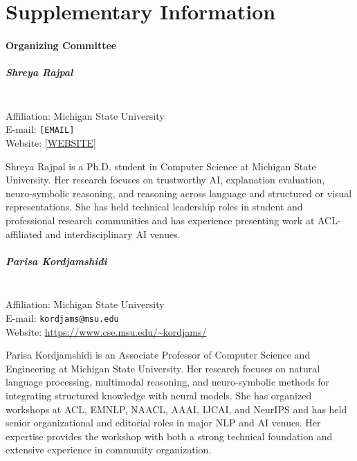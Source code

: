 \documentclass[11pt]{article}
\begin{document}
\newpage
\section*{Supplementary Information}

\paragraph{Organizing Committee}

\subparagraph{Shreya Rajpal}
\phantom{ }\\
\indent Affiliation: Michigan State University\\
\indent E-mail: \texttt{[EMAIL]}\\
\indent Website: \url{[WEBSITE]}

Shreya Rajpal is a Ph.D. student in Computer Science at Michigan State
University. Her research focuses on trustworthy AI, explanation
evaluation, neuro-symbolic reasoning, and reasoning across language and
structured or visual representations. 
She has held technical
leadership roles in student and professional research communities and
has experience presenting work at ACL-affiliated and interdisciplinary
AI venues.

\subparagraph{Parisa Kordjamshidi}
\phantom{ }\\
\indent Affiliation: Michigan State University\\
\indent E-mail: \texttt{kordjams@msu.edu}\\
\indent Website:
\url{https://www.cse.msu.edu/~kordjams/}

Parisa Kordjamshidi is an Associate Professor of Computer Science and
Engineering at Michigan State University. Her research focuses on
natural language processing, multimodal reasoning, and neuro-symbolic
methods for integrating structured knowledge with neural models. She
has organized workshops at ACL, EMNLP, NAACL, AAAI, IJCAI, and NeurIPS
and has held senior organizational and editorial roles in major NLP and
AI venues. Her expertise provides the workshop with both a strong
technical foundation and extensive experience in community
organization.

\end{document}

